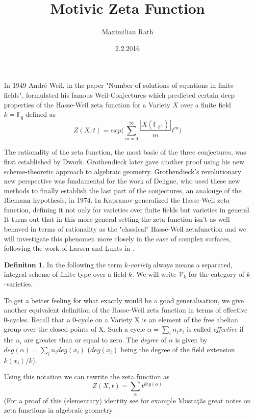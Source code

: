 \documentclass[11pt, a4paper, german]{article}
\author{Maximilian Rath}
\date{2.2.2016}
\title{Motivic Zeta Function}
\theoremstyle{plain}
\theoremstyle{definition}
\newtheorem{definition}[theorem]{Definiton}
\begin{document}
\maketitle
In 1949 Andr\'e Weil, in the paper "Number of solutions of equations in finite fields", formulated his famous Weil-Conjectures
which predicted certain deep properties of the Hasse-Weil zeta function for a Variety $X$ over a finite field $k = \mathbb{F}_q$ defined as
\[
    Z(X,t) = exp \big(\sum_{m=0}^\infty \frac{|X(\mathbb{F}_{q^m})|}{m} t^m \big)
\]

The rationality of the zeta function, the most basic of the three conjectures, was first established by Dwork. Grothendieck later gave another
proof using his new scheme-theoretic approach to algebraic geometry.
Grothendieck's revolutionary new perspective was fundamental for the work of Deligne, who used these new methods to finally establish the 
last part of the conjectures, an analouge of the Riemann hypothesis, in 1974.
In \cite{kapranov} Kapranov generalized the Hasse-Weil zeta function, defining it not only for varieties over finite fields
but varieties in general. It turns out that in this more general setting the zeta function isn't as well behaved in terms of rationality as
the "classical" Hasse-Weil zetafunction and we will investigate this phenomen more closely in the case of complex surfaces, following the 
work of Larsen and Lunts in \cite{MR1996804}.

\begin{definition}
    In the following the term \emph{$k$-variety} always means a separated, integral scheme of finite type over a field $k$.
    We will write $\mathcal{V}_k$ for the category of $k$-varieties.
\end{definition}

To get a better feeling for what exactly would be a good generalisation, we give another equivalent definition of the Hasse-Weil zeta function in
terms of effective 0-cycles. Recall that a 0-cycle on a Variety X is an element of the free abelian group over the closed 
points of X. Such a cycle $\alpha = \sum_i n_i x_i$ is called \emph{effective} if the $n_i$ are greater than or equal to zero.
The \emph{degree} of $\alpha$ is given by $deg(\alpha) = \sum_i n_i deg(x_i)$ ($deg(x_i)$ being the degree of the field extension $k(x_i)/k$).

Using this notation we can rewrite the zeta function as 
\begin{equation}
    Z(X,t) = \sum_{\alpha} t^{deg(\alpha)}
\end{equation}
(For a proof of this (elementary) identity see for example Musta\c{t}\u{a}s great notes on zeta functions in algebraic geometry 
\cite[Remark 2.9]{mustata}
\end{document}
